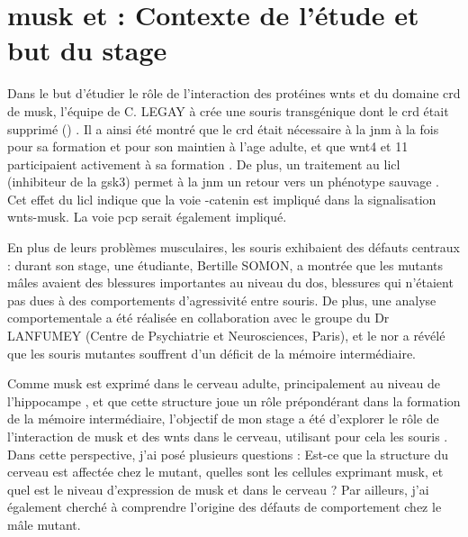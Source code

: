 \section{\acrshort{musk} et  : Contexte de l'étude et but du stage}
\label{sec:Contexte}	
	Dans le but d'étudier le rôle de l'interaction des protéines \Glspl{wnt} et du domaine \gls{crd} de \gls{musk}, l'équipe de C. LEGAY à crée une souris transgénique dont le \gls{crd} était supprimé (\mcrd) \cite{Messeant2015, Messeant2017}. Il a ainsi été montré que le \gls{crd} était nécessaire à la \gls{jnm} à la fois pour sa formation et pour son maintien à l'age adulte, et que \Gls{wnt}4 et 11 participaient activement à sa formation . De plus, un traitement au \gls{licl} (inhibiteur de la \gls{gsk3}) permet à la \gls{jnm} un retour vers un phénotype sauvage \cite{Messeant2015}. Cet effet du \gls{licl} indique que la voie \textbeta{}-catenin est impliqué dans la signalisation \Glspl{wnt}-\gls{musk}. La voie \gls{pcp} serait également impliqué.
	
	En plus de leurs problèmes musculaires, les souris \mcrd exhibaient des défauts centraux : durant son stage, une étudiante, Bertille SOMON, a montrée que les mutants mâles avaient des blessures importantes au niveau du dos, blessures qui n'étaient pas dues à des comportements d'agressivité entre souris. De plus, une analyse comportementale a été réalisée en collaboration avec le groupe du Dr LANFUMEY (Centre de Psychiatrie et Neurosciences, Paris), et le \gls{nor} a révélé que les souris mutantes souffrent d'un déficit de la mémoire intermédiaire.
	
	Comme \gls{musk} est exprimé dans le cerveau adulte, principalement au niveau de l'hippocampe \cite{Garcia-Osta2006}, et que cette structure joue un rôle prépondérant dans la formation de la mémoire intermédiaire, l'objectif de mon stage a été d'explorer le rôle de l'interaction de \gls{musk} et des \Glspl{wnt} dans le cerveau, utilisant pour cela les souris \mcrd. Dans cette perspective, j'ai posé plusieurs questions : Est-ce que la structure du cerveau est affectée chez le mutant, quelles sont les cellules exprimant \gls{musk}, et quel est le niveau d'expression de \gls{musk} et \mcrd dans le cerveau ? Par ailleurs, j'ai également cherché à comprendre l'origine des défauts de comportement chez le mâle mutant.
	
